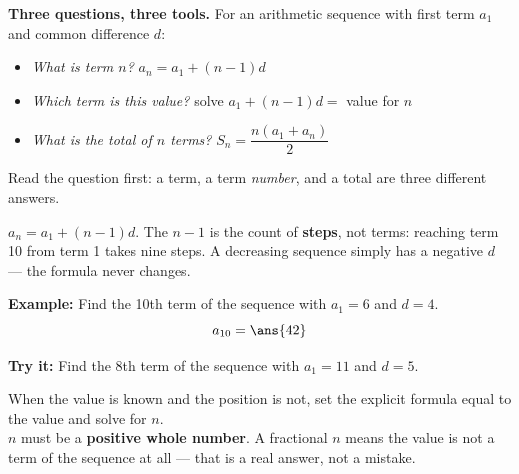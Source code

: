 \documentclass[12pt]{article}
\begin{document}

\begin{formulabox}
\textbf{Three questions, three tools.} For an arithmetic sequence with first
term $a_1$ and common difference $d$:
\begin{itemize}[leftmargin=0.9cm, itemsep=1pt, topsep=1pt]
\item \emph{What is term $n$?} \quad $a_n = a_1 + (n-1)d$
\item \emph{Which term is this value?} \quad solve $a_1 + (n-1)d = $ value for $n$
\item \emph{What is the total of $n$ terms?} \quad
$S_n = \dfrac{n(a_1 + a_n)}{2}$
\end{itemize}
Read the question first: a term, a term \emph{number}, and a total are three
different answers.
\end{formulabox}


\begin{formulabox}
$a_n = a_1 + (n-1)d$. The $n-1$ is the count of \textbf{steps}, not terms:
reaching term 10 from term 1 takes nine steps. A decreasing sequence simply has
a negative $d$ --- the formula never changes.
\end{formulabox}

\begin{examplebox}
\textbf{Example:} Find the 10th term of the sequence with $a_1 = 6$ and
$d = 4$.
\[ a_{10} = \ans{42} \]
\end{examplebox}

\begin{tryitbox}
\textbf{Try it:} Find the 8th term of the sequence with $a_1 = 11$ and
$d = 5$.\\[2pt]
\end{tryitbox}


\begin{formulabox}
When the value is known and the position is not, set the explicit formula equal
to the value and solve for $n$.\\[2pt]
$n$ must be a \textbf{positive whole number}. A fractional $n$ means the value is
not a term of the sequence at all --- that is a real answer, not a mistake.
\end{formulabox}
\end{document}
